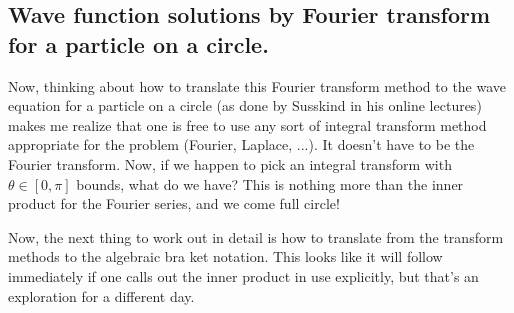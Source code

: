 \documentclass{article}
\newcommand{\IIinf}[0]{ \int_{-\infty}^\infty }
\begin{document}
%

\subsection{ Wave function solutions by Fourier transform for a particle on a circle. }

Now, thinking about how to translate this Fourier transform method to the 
wave equation for a particle on a circle (as done by Susskind in his online lectures) makes me realize that one
is free to use any sort of integral transform method appropriate for the problem (Fourier, Laplace, ...).
It doesn't have to be the Fourier transform.  Now, if we happen to pick an integral transform with $\theta \in [0, \pi]$ bounds, what do we have?  This is nothing more than the inner product for the Fourier series, and we come full circle!

Now, the next thing to work out in detail is how to translate from the transform methods to the algebraic bra ket notation.  This
looks like it will follow immediately if one calls out the inner product in use explicitly, but that's an exploration for a
different day.

%
%
\end{document}
